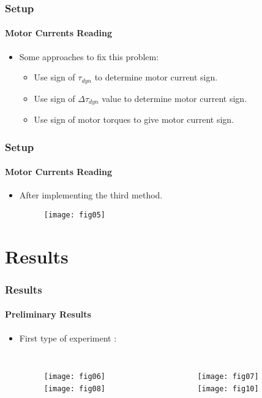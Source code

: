 \documentclass[12pt,english]{beamer}
\begin{document}
  \begin{frame}
    \frametitle{Setup}
    \framesubtitle{Motor Currents Reading}
    \begin{itemize}
      \item Some approaches to fix this problem:
      \begin{itemize}
        \item Use sign of $\tau_{dyn}$ to determine motor current sign.
        \item Use sign of $\Delta \tau_{dyn}$ value to determine motor current sign.
        \item Use sign of motor torques to give motor current sign.
      \end{itemize}
    \end{itemize}
  \end{frame}  
  
  \begin{frame}
    \frametitle{Setup}
    \framesubtitle{Motor Currents Reading}
    \begin{itemize}
      \item After implementing the third method.
      \begin{figure}
        \texttt{[image: fig05]}
      \end{figure}
    \end{itemize}
  \end{frame}  

  \section{Results}
  \begin{frame}
    \frametitle{Results}
    \framesubtitle{Preliminary Results}
    \begin{itemize}
      \item First type of experiment :
      \begin{columns}
        \begin{figure}
          \texttt{[image: fig06]} \,
          \texttt{[image: fig08]} \,
        \end{figure}
        \begin{figure}
          \texttt{[image: fig07]} \,
          \texttt{[image: fig10]} \,
        \end{figure}
      \end{columns}
    \end{itemize}
  \end{frame}
  
\end{document}
